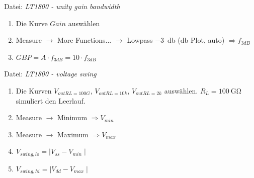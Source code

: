 \documentclass[
	ngerman,
	parskip=half,
	twocolumn,
	DIV=calc,
	]{scrartcl}
\begin{document}
	
	Datei: \emph{LT1800 - unity gain bandwidth}
	\begin{enumerate}
		\item Die Kurve $Gain$ auswählen
		\item Measure $\rightarrow$ More Functions... $\rightarrow$ Lowpass \SI{-3}{\decibel} (db Plot, auto) $\Rightarrow f_{3dB}$
		\item $ GBP = A \cdot f_{3dB} = 10 \cdot f_{3dB} $
	\end{enumerate}
	
	Datei: \emph{LT1800 - voltage swing}
	\begin{enumerate}
		\item Die Kurven $V_{out RL=100G}$, $V_{out RL=10k}$, $V_{out RL=2k}$ auswählen. $R_L=\SI{100}{\giga\ohm}$ simuliert den Leerlauf.
		\item Measure $\rightarrow$ Minimum $\Rightarrow V_{min}$
		\item Measure $\rightarrow$ Maximum $\Rightarrow V_{max}$
		\item $V_{swing, lo} = \mid V_{ss} - V_{min} \mid$
		\item $V_{swing, hi} = \mid V_{dd} - V_{max} \mid$
	\end{enumerate}

\listoffigures
\listoftables
\printbibliography
		
\end{document}
